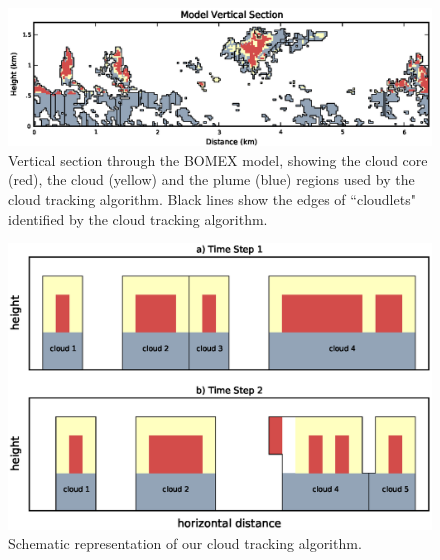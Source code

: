 \documentclass[acp]{copernicus}
\begin{document}






\begin{figure}[t]
\vspace*{2mm}
\begin{center}
\includegraphics[width=\textwidth]{./figures/vertical_section}
\end{center}
\caption{Vertical section through the BOMEX model, showing the cloud core
(red), the cloud (yellow) and the plume (blue) regions used by the cloud 
tracking algorithm. Black lines show the edges of ``cloudlets" identified by 
the cloud tracking algorithm.}
\label{fig:vertical_section}
\end{figure}

\begin{figure}[t]
\vspace*{2mm}
\begin{center}
\includegraphics[width=\textwidth]{./figures/cloudfinder_instructions}
\end{center}
\caption{Schematic representation of our cloud tracking algorithm.}
\label{fig:cloudfinder_instructions}
\end{figure}
\end{document}
